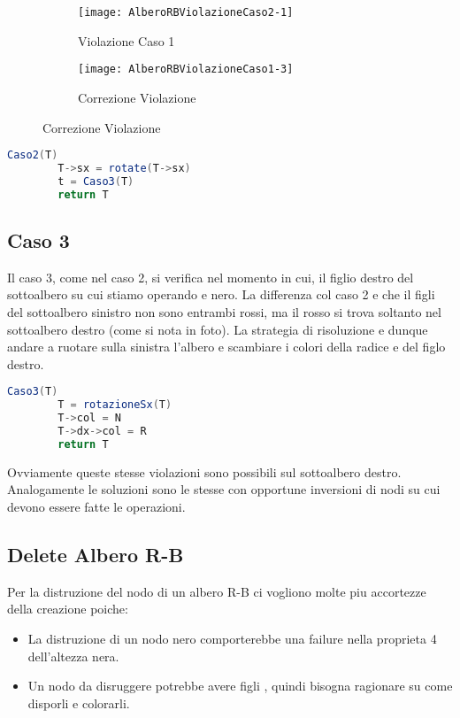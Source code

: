 \begin{figure}[H]
    \centering
    \begin{subfigure}[b]{0.35\textwidth}
        \texttt{[image: AlberoRBViolazioneCaso2-1]} 
        \caption{Violazione Caso 1}
    \end{subfigure}
    \hfill
    \begin{subfigure}[b]{0.35\textwidth}
        \texttt{[image: AlberoRBViolazioneCaso1-3]} 
        \caption{Correzione Violazione}
    \end{subfigure}
\end{figure}

\begin{lstlisting}[language=Java]
	Caso2(T)
		T->sx = rotate(T->sx)
		t = Caso3(T)
		return T
\end{lstlisting}

\subsection{Caso 3}

Il caso 3, come nel caso 2, si verifica nel momento in cui, il figlio destro del sottoalbero su cui stiamo operando e nero. La differenza col caso 2 e che il figli del sottoalbero sinistro non sono entrambi rossi, ma il rosso si trova soltanto nel sottoalbero destro (come si nota in foto).
La strategia di risoluzione e dunque andare a ruotare sulla sinistra l'albero e scambiare i colori della radice e del figlo destro.

\begin{lstlisting}[language=Java]
	Caso3(T)
		T = rotazioneSx(T)
		T->col = N 
		T->dx->col = R
		return T
\end{lstlisting}

Ovviamente queste stesse violazioni sono possibili sul sottoalbero destro. Analogamente le soluzioni sono le stesse con opportune inversioni di nodi su cui devono essere fatte le operazioni.

\subsection{Delete Albero R-B}
Per la distruzione del nodo di un albero R-B ci vogliono molte piu accortezze della creazione poiche:
\begin{itemize}
	\item La distruzione di un nodo nero comporterebbe una failure nella proprieta 4 dell'altezza nera.
	\item Un nodo da disruggere potrebbe avere figli , quindi bisogna ragionare su come disporli e colorarli.
\end{itemize}

